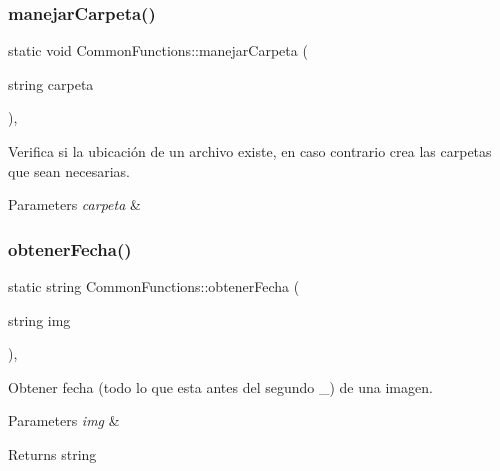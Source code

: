 \subsubsection{\texorpdfstring{manejar\+Carpeta()}{manejarCarpeta()}}
{\footnotesize\ttfamily static void Common\+Functions\+::manejar\+Carpeta (\begin{DoxyParamCaption}\item[{string}]{carpeta }\end{DoxyParamCaption})\hspace{0.3cm}{\ttfamily [inline]}, {\ttfamily [static]}}



Verifica si la ubicación de un archivo existe, en caso contrario crea las carpetas que sean necesarias. 


\begin{DoxyParams}{Parameters}
{\em carpeta} & \\
\hline
\end{DoxyParams}
\mbox{\label{classCommonFunctions_a6b4829d1fab8cd74c15c540cf97fe237}} 
\subsubsection{\texorpdfstring{obtener\+Fecha()}{obtenerFecha()}}
{\footnotesize\ttfamily static string Common\+Functions\+::obtener\+Fecha (\begin{DoxyParamCaption}\item[{string}]{img }\end{DoxyParamCaption})\hspace{0.3cm}{\ttfamily [inline]}, {\ttfamily [static]}}



Obtener fecha (todo lo que esta antes del segundo \+\_\+) de una imagen. 


\begin{DoxyParams}{Parameters}
{\em img} & \\
\hline
\end{DoxyParams}
\begin{DoxyReturn}{Returns}
string 
\end{DoxyReturn}
\mbox{\label{classCommonFunctions_a1c75d9fe2327ecfa13a4a1078e00c644}} 
